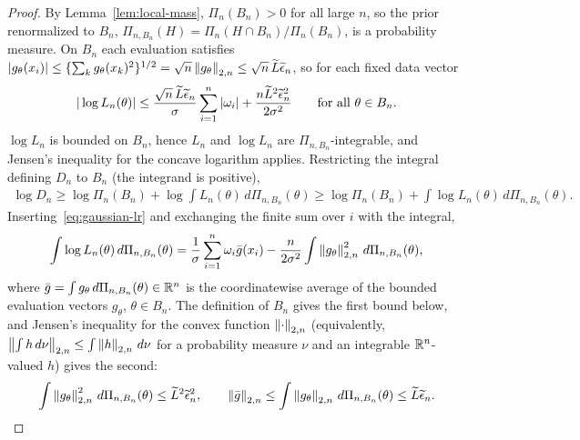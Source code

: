 \begin{proof}
By Lemma~\ref{lem:local-mass}, $\Pi_n(B_n)>0$ for all large $n$, so the prior renormalized to $B_n$, $\Pi_{n,B_n}(H)=\Pi_n(H\cap B_n)/\Pi_n(B_n)$, is a probability measure. On $B_n$ each evaluation satisfies $|g_\theta(x_i)|\leq\{\sum_kg_\theta(x_k)^2\}^{1/2}=\sqrt n\left\lVert g_\theta \right\rVert_{2,n}\leq\sqrt n\,\widetilde L\widetilde{\epsilon}_n$, so for each fixed data vector
\begin{align*}
|\log L_n(\theta)|
\leq\frac{\sqrt n\,\widetilde L\widetilde{\epsilon}_n}{\sigma}\sum_{i=1}^n|\omega_i|+\frac{n\widetilde L^2\widetilde{\epsilon}_n^2}{2\sigma^2}
\qquad\text{for all }\theta\in B_n.
\end{align*}
$\log L_n$ is bounded on $B_n$, hence $L_n$ and $\log L_n$ are $\Pi_{n,B_n}$-integrable, and Jensen's inequality for the concave logarithm applies. Restricting the integral defining $D_n$ to $B_n$ (the integrand is positive),
\begin{align*}
\log D_n
\geq\log\Pi_n(B_n)+\log\int L_n(\theta)\,d\Pi_{n,B_n}(\theta)
\geq\log\Pi_n(B_n)+\int\log L_n(\theta)\,d\Pi_{n,B_n}(\theta).
\end{align*}
Inserting~\eqref{eq:gaussian-lr} and exchanging the finite sum over $i$ with the integral,
\begin{align*}
\int\log L_n(\theta)\,d\Pi_{n,B_n}(\theta)
=\frac1\sigma\sum_{i=1}^n\omega_i\bar g(x_i)
 -\frac{n}{2\sigma^2}\int\left\lVert g_\theta \right\rVert_{2,n}^2\,d\Pi_{n,B_n}(\theta),
\end{align*}
where $\bar g=\int g_\theta\,d\Pi_{n,B_n}(\theta)\in\mathbb{R}^n$ is the coordinatewise average of the bounded evaluation vectors $g_\theta$, $\theta\in B_n$. The definition of $B_n$ gives the first bound below, and Jensen's inequality for the convex function $\left\lVert \cdot \right\rVert_{2,n}$ (equivalently, $\left\lVert \int h\,d\nu \right\rVert_{2,n}\leq\int\left\lVert h \right\rVert_{2,n}\,d\nu$ for a probability measure $\nu$ and an integrable $\mathbb{R}^n$-valued $h$) gives the second:
\begin{align*}
\int\left\lVert g_\theta \right\rVert_{2,n}^2\,d\Pi_{n,B_n}(\theta)\leq\widetilde L^2\widetilde{\epsilon}_n^2,
\qquad
\left\lVert \bar g \right\rVert_{2,n}\leq\int\left\lVert g_\theta \right\rVert_{2,n}\,d\Pi_{n,B_n}(\theta)\leq\widetilde L\widetilde{\epsilon}_n .
\end{align*}


\end{proof}
